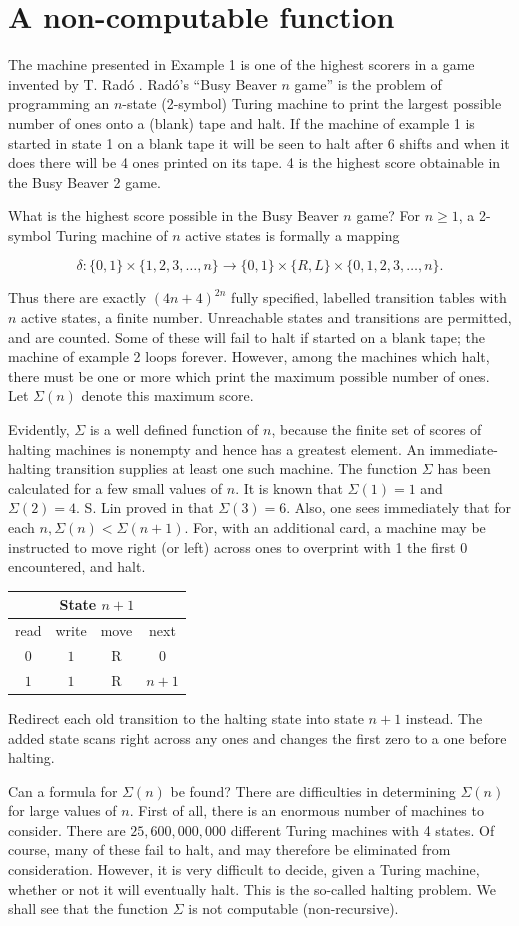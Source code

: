 \documentclass[11pt]{article}
\makeatletter
\newcommand{\origpage}[1]{\marginnote{\footnotesize\textbf{[#1]}}}
\newcommand{\card}[7]{%
\begingroup\setlength{\tabcolsep}{4.1pt}\renewcommand{\arraystretch}{1.13}%
\begin{tabular}{@{}c|ccc@{}}\multicolumn{4}{c}{\textbf{State $#1$}}\\
\toprule
\scriptsize read & \scriptsize write & \scriptsize move & \scriptsize next\\
\midrule
$0$ & $#2$ & $\mathrm{#3}$ & $#4$\\
$1$ & $#5$ & $\mathrm{#6}$ & $#7$\\
\bottomrule
\end{tabular}\endgroup}
\makeatother
\begin{document}
\section{A non-computable function} The machine presented in Example 1 is one of the highest scorers in a game invented by T. Radó \cite{r32}. Radó's ``Busy Beaver $n$ game'' is the problem of programming an $n$-state (2-symbol) Turing machine to print the largest possible number of ones onto a (blank) tape and halt. If the machine of example 1 is started in state 1 on a blank tape it will be seen to halt after 6 shifts and when it does there will be 4 ones printed on its tape. 4 is the highest score obtainable in the Busy Beaver 2 game.

What is the highest score possible in the Busy Beaver $n$ game? For $n\geq1$, a 2-symbol Turing machine of $n$ active states is formally a mapping

\[
\delta:\{0,1\} \times\{1,2,3, \ldots,n\} \rightarrow\{0,1\} \times\{R, L\} \times\{0,1,2,3,\ldots,n\} .
\]

Thus there are exactly $(4n+4)^{2n}$ fully specified, labelled transition tables with $n$ active states, a finite number. Unreachable states and transitions are permitted, and are counted. Some of these will fail to halt if started on a blank tape; the machine of example 2 loops forever. However, among the machines which halt, there must be one or more which print the maximum possible number of ones. Let $\Sigma(n)$ denote this maximum score.

Evidently, $\Sigma$ is a well defined function of $n$, because the finite set of scores of halting machines is nonempty and hence has a \origpage{733}greatest element. An immediate-halting transition supplies at least one such machine. The function $\Sigma$ has been calculated for a few small values of $n$. It is known that $\Sigma(1)=1$ and $\Sigma(2)=4$. S. Lin proved in \cite{r19} that $\Sigma(3)=6$. Also, one sees immediately that for each $n, \Sigma(n)<\Sigma(n+1)$. For, with an additional card, a machine may be instructed to move right (or left) across ones to overprint with 1 the first 0 encountered, and halt.
\begin{center}
\card{n+1}{1}{R}{0}{1}{R}{n+1}
\end{center}
Redirect each old transition to the halting state into state $n+1$ instead.
The added state scans right across any ones and changes the first zero to a one before halting.

Can a formula for $\Sigma(n)$ be found?
There are difficulties in determining $\Sigma(n)$ for large values of $n$. First of all, there is an enormous number of machines to consider. There are $25{,}600{,}000{,}000$ different Turing machines with 4 states. Of course, many of these fail to halt, and may therefore be eliminated from consideration. However, it is very difficult to decide, given a Turing machine, whether or not it will eventually halt. This is the so-called halting problem. We shall see that the function $\Sigma$ is not computable (non-recursive).
\end{document}
